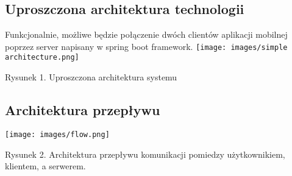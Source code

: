 \subsection{Uproszczona architektura technologii}
\tab Funkcjonalnie, możliwe będzie połączenie dwóch clientów aplikacji mobilnej poprzez server napisany w spring boot framework.
\newpage
\texttt{[image: images/simple architecture.png]}
\begin{center}
	\footnotesize
	Rysunek 1. Uproszczona architektura systemu
\end{center}
\subsection{Architektura przepływu}
\texttt{[image: images/flow.png]}
\begin{center}
	\footnotesize
	Rysunek 2. Architektura przepływu komunikacji pomiedzy użytkownikiem, klientem, a serwerem.
\end{center}
